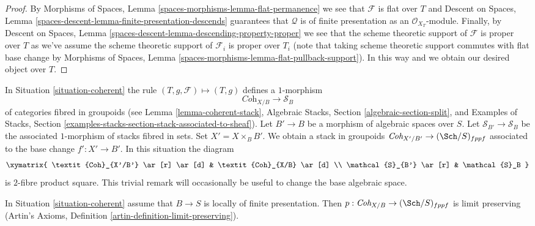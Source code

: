 \begin{proof}
By Morphisms of Spaces, Lemma \ref{spaces-morphisms-lemma-flat-permanence}
we see that $\mathcal{F}$ is flat over $T$ and
Descent on Spaces, Lemma
\ref{spaces-descent-lemma-finite-presentation-descends}
guarantees that $\mathcal{Q}$ is of finite presentation as an
$\mathcal{O}_{X_T}$-module. Finally, by
Descent on Spaces, Lemma \ref{spaces-descent-lemma-descending-property-proper}
we see that the scheme theoretic support of $\mathcal{F}$ is proper over
$T$ as we've assume the scheme theoretic support of $\mathcal{F}_i$
is proper over $T_i$ (note that taking scheme theoretic support commutes
with flat base change by
Morphisms of Spaces, Lemma \ref{spaces-morphisms-lemma-flat-pullback-support}).
In this way
and we obtain our desired object over $T$.
\end{proof}

\begin{remark}
\label{remark-coherent-base-change}
In Situation \ref{situation-coherent} the rule
$(T, g, \mathcal{F}) \mapsto (T, g)$ defines a $1$-morphism
$$
\textit{Coh}_{X/B} \longrightarrow \mathcal{S}_B
$$
of categories fibred in groupoids
(see Lemma \ref{lemma-coherent-stack},
Algebraic Stacks, Section \ref{algebraic-section-split}, and
Examples of Stacks, Section
\ref{examples-stacks-section-stack-associated-to-sheaf}).
Let $B' \to B$ be a morphism of
algebraic spaces over $S$. Let $\mathcal{S}_{B'} \to \mathcal{S}_B$
be the associated $1$-morphism of stacks fibred in sets.
Set $X' = X \times_B B'$.
We obtain a stack in groupoids $\textit{Coh}_{X'/B'} \to (\Sch/S)_{fppf}$
associated to the base change $f' : X' \to B'$. In this situation
the diagram
$$
\xymatrix{
\textit{Coh}_{X'/B'} \ar[r] \ar[d] & \textit{Coh}_{X/B} \ar[d] \\
\mathcal{S}_{B'} \ar[r] & \mathcal{S}_B
}
$$
is $2$-fibre product square. This trivial remark
will occasionally be useful to change the base algebraic space.
\end{remark}

\begin{lemma}
\label{lemma-coherent-limits}
In Situation \ref{situation-coherent} assume that $B \to S$
is locally of finite presentation. Then
$p : \textit{Coh}_{X/B} \to (\Sch/S)_{fppf}$ is limit preserving
(Artin's Axioms, Definition \ref{artin-definition-limit-preserving}).
\end{lemma}

